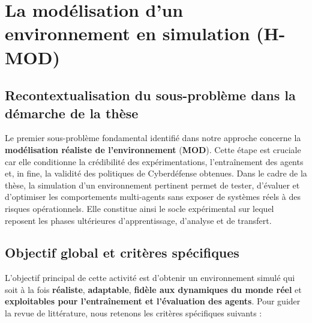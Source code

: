 \section{La modélisation d'un environnement en simulation (H-MOD)}

\subsection*{Recontextualisation du sous-problème dans la démarche de la thèse}

Le premier sous-problème fondamental identifié dans notre approche concerne la \textbf{modélisation réaliste de l'environnement} (\textbf{MOD}). Cette étape est cruciale car elle conditionne la crédibilité des expérimentations, l'entraînement des agents et, in fine, la validité des politiques de Cyberdéfense obtenues. Dans le cadre de la thèse, la simulation d'un environnement pertinent permet de tester, d'évaluer et d'optimiser les comportements multi-agents sans exposer de systèmes réels à des risques opérationnels. Elle constitue ainsi le socle expérimental sur lequel reposent les phases ultérieures d'apprentissage, d'analyse et de transfert. \subsection*{Objectif global et critères spécifiques} L'objectif principal de cette activité est d'obtenir un environnement simulé qui soit à la fois \textbf{réaliste}, \textbf{adaptable}, \textbf{fidèle aux dynamiques du monde réel} et \textbf{exploitables pour l'entraînement et l'évaluation des agents}. Pour guider la revue de littérature, nous retenons les critères spécifiques suivants :
%
